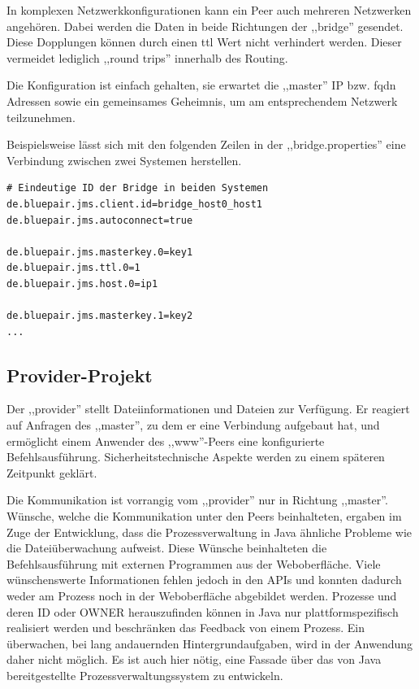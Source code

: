 \documentclass[oneside, ngerman, toc=bibliography,bibliography=totoc,listof=entryprefix, open=right,numbers=noenddot,fontsize=12pt]{scrbook}
\begin{document}
In komplexen Netzwerkkonfigurationen kann ein Peer auch mehreren Netzwerken angehören.
Dabei werden die Daten in beide Richtungen der ,,bridge'' gesendet. Diese Dopplungen können durch einen \acrfull{ttl} Wert nicht verhindert werden. Dieser vermeidet lediglich ,,round trips'' innerhalb des Routing.

Die Konfiguration ist einfach gehalten, sie erwartet die ,,master'' IP bzw. \acrfull{fqdn} Adressen sowie ein gemeinsames Geheimnis, um am entsprechendem Netzwerk teilzunehmen.

\bigskip
Beispielsweise lässt sich mit den folgenden Zeilen in der ,,bridge.properties'' eine Verbindung zwischen zwei Systemen herstellen.

\begin{verbatim}
# Eindeutige ID der Bridge in beiden Systemen
de.bluepair.jms.client.id=bridge_host0_host1
de.bluepair.jms.autoconnect=true

de.bluepair.jms.masterkey.0=key1
de.bluepair.jms.ttl.0=1
de.bluepair.jms.host.0=ip1

de.bluepair.jms.masterkey.1=key2
...
\end{verbatim}


\subsection{Provider-Projekt}
Der ,,provider'' stellt Dateiinformationen und Dateien zur Verfügung. Er reagiert auf Anfragen des ,,master'', zu dem er eine Verbindung aufgebaut hat, und ermöglicht einem Anwender des ,,www''-Peers eine konfigurierte Befehlsausführung. Sicherheitstechnische Aspekte werden zu einem späteren Zeitpunkt geklärt. 

Die Kommunikation ist vorrangig vom ,,provider'' nur in Richtung ,,master''. 
Wünsche, welche die Kommunikation unter den Peers beinhalteten, ergaben im Zuge der Entwicklung, dass die Prozessverwaltung in Java ähnliche Probleme wie die Dateiüberwachung aufweist. Diese Wünsche beinhalteten die Befehlsausführung mit externen Programmen aus der Weboberfläche. Viele wünschenswerte Informationen fehlen jedoch in den APIs und konnten dadurch weder am Prozess noch in der Weboberfläche abgebildet werden. Prozesse und deren ID oder OWNER herauszufinden können in Java nur plattformspezifisch realisiert werden und beschränken das Feedback von einem Prozess. Ein überwachen, bei lang andauernden Hintergrundaufgaben, wird in der Anwendung daher nicht möglich. Es ist auch hier nötig, eine Fassade über das von Java bereitgestellte Prozessverwaltungssystem zu entwickeln.
\end{document}
